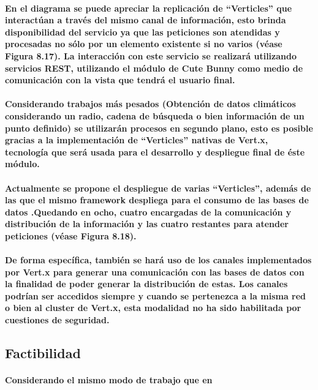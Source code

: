    \paragraph{En el diagrama se puede apreciar la replicación de ``Verticles'' que interactúan a través del mismo canal de información, esto brinda disponibilidad del servicio ya que las peticiones son atendidas y procesadas no sólo por un elemento existente si no varios (véase Figura 8.17). La interacción con este servicio se realizará utilizando servicios REST, utilizando el módulo de Cute Bunny como medio de comunicación con la vista que tendrá el usuario final.}
    \paragraph{Considerando trabajos más pesados (Obtención de datos climáticos considerando un radio, cadena de búsqueda o bien información de un punto definido) se utilizarán procesos en segundo plano, esto es posible gracias a la implementación de ``Verticles'' nativas de Vert.x, tecnología que será usada para el desarrollo y despliegue final de éste módulo.}
    \paragraph{Actualmente se propone el despliegue de varias ``Verticles'', además de las que el mismo framework despliega para el consumo de las bases de datos \cite{33}.Quedando en ocho, cuatro encargadas de la comunicación y distribución de la información y las cuatro restantes para atender peticiones (véase Figura 8.18).} 
    \paragraph{De forma específica, también se hará uso de los canales implementados por Vert.x para generar una comunicación con las bases de datos con la finalidad de poder generar la distribución de estas. Los canales podrían ser accedidos siempre y cuando se pertenezca a la misma red o bien al cluster de Vert.x, esta modalidad no ha sido habilitada por cuestiones de seguridad.}
  \subsection{Factibilidad} 
    \paragraph{Considerando el mismo modo de trabajo que en }
